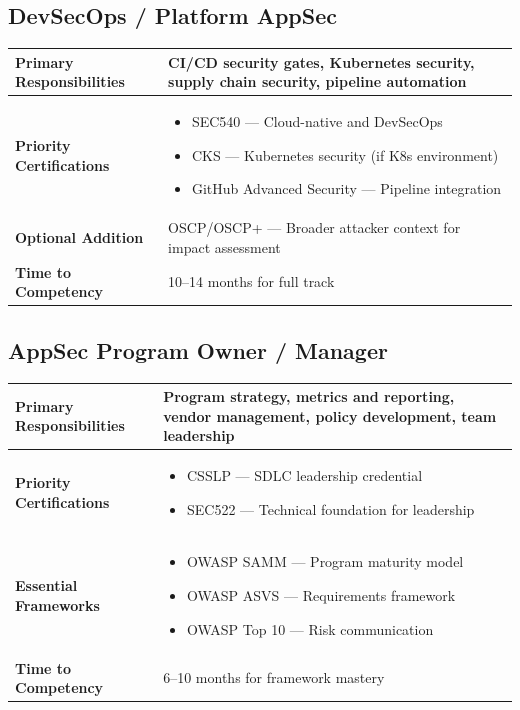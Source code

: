 \documentclass[11pt,letterpaper]{article}
\begin{document}
\subsection{DevSecOps / Platform AppSec}

\begin{table}[H]
\centering
\begin{tabularx}{\textwidth}{l X}
\toprule
\textbf{Primary Responsibilities} & CI/CD security gates, Kubernetes security, supply chain security, pipeline automation \\
\midrule
\textbf{Priority Certifications} & \begin{itemize}[nosep,leftmargin=*]
    \item SEC540 --- Cloud-native and DevSecOps
    \item CKS --- Kubernetes security (if K8s environment)
    \item GitHub Advanced Security --- Pipeline integration
\end{itemize} \\
\midrule
\textbf{Optional Addition} & OSCP/OSCP+ --- Broader attacker context for impact assessment \\
\midrule
\textbf{Time to Competency} & 10--14 months for full track \\
\bottomrule
\end{tabularx}
\end{table}

\subsection{AppSec Program Owner / Manager}

\begin{table}[H]
\centering
\begin{tabularx}{\textwidth}{l X}
\toprule
\textbf{Primary Responsibilities} & Program strategy, metrics and reporting, vendor management, policy development, team leadership \\
\midrule
\textbf{Priority Certifications} & \begin{itemize}[nosep,leftmargin=*]
    \item CSSLP --- SDLC leadership credential
    \item SEC522 --- Technical foundation for leadership
\end{itemize} \\
\midrule
\textbf{Essential Frameworks} & \begin{itemize}[nosep,leftmargin=*]
    \item OWASP SAMM --- Program maturity model
    \item OWASP ASVS --- Requirements framework
    \item OWASP Top 10 --- Risk communication
\end{itemize} \\
\midrule
\textbf{Time to Competency} & 6--10 months for framework mastery \\
\bottomrule
\end{tabularx}
\end{table}
\end{document}
